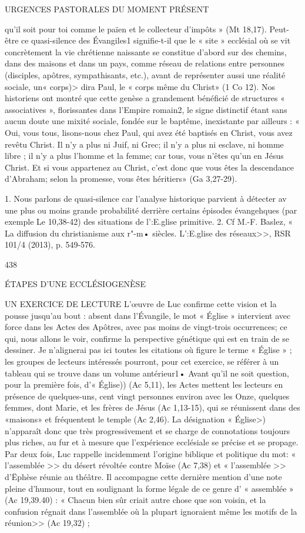 URGENCES PASTORALES DU MOMENT PRÉSENT

qu'il soit pour toi comme le païen et le collecteur d'impôts »
(Mt 18,17).
Peut-être ce quasi-silence des Évangiles1 signifie-t-il que le
« site » ecclésial où se vit concrètement la vie chrétienne naissante se constitue d'abord sur des chemins, dans des maisons et dans un pays, comme réseau de relations entre personnes (disciples, apôtres, sympathisants, etc.), avant de représenter aussi une réalité sociale, un« corps)> dira Paul, le « corps même du Christ» (1 Co 12). Nos historiens ont montré que cette genèse a grandement bénéficié de structures « associatives », florissantes dans l'Empire romain2, le signe distinctif étant sans aucun doute une mixité sociale, fondée sur le baptême, inexistante par ailleurs :
« Oui, vous tous, lisons-nous chez Paul, qui avez été baptisés en Christ, vous avez revêtu Christ. Il n'y a plus ni Juif, ni Grec; il n'y a plus ni esclave, ni homme libre ; il n'y a plus l'homme et la femme; car tous, vous n'êtes qu'un en Jésus Christ. Et si vous appartenez au Christ, c'est donc que vous êtes la descendance d'Abraham; selon la promesse, vous êtes héritiers» (Ga 3,27-29).




1.	Nous parlons de quasi-silence car l'analyse historique parvient à détecter av une plus ou moins grande probabilité derrière certains épisodes évangehques (par exemple Le 10,38-42) des situations de l':E.glise primitive.
2.	Cf M.-F. Baslez, « La diffusion du christianisme aux r"-m• siècles.
L':E.glise des réseaux>>, RSR 101/4 (2013), p. 549-576.

438
 
ÉTAPES D'UNE ECCLÉSIOGENÈSE


UN EXERCICE DE LECTURE
L'œuvre de Luc confirme cette vision et la pousse jusqu'au bout : absent dans l'Évangile, le mot « Église » intervient avec force dans les Actes des Apôtres, avec pas moins de vingt-trois occurrences; ce qui, nous allons le voir, confirme la perspective génétique qui est en train de se dessiner. Je n'alignerai pas ici toutes les citations où figure le terme « Église » ; les groupes de lecteurs intéressés pourront, pour cet exercice, se référer à un tableau qui se trouve dans un volume antérieur1•
Avant qu'il ne soit question, pour la première fois,
d'« Église)) (Ac 5,11), les Actes mettent les lecteurs en présence de quelques-uns, cent vingt personnes environ avec les Onze, quelques femmes, dont Marie, et les frères de Jésus (Ac 1,13-15), qui se réunissent dans des «maisons» et fréquentent le temple (Ac 2,46). La désignation « Église>) n'apparaît donc que très progressivement et se charge de connotations toujours plus riches, au fur et à mesure que l'expérience ecclésiale se précise et se propage. Par deux fois, Luc rappelle incidemment l'origine biblique et politique du mot: « l'assemblée >> du désert révoltée contre Moïse (Ac 7,38) et « l'assemblée >> d'Ëphèse réunie au théâtre. Il accompagne cette dernière mention d'une note pleine d'humour, tout en soulignant la forme légale de ce genre d' « assemblée » (Ac 19,39.40) : « Chacun bien sûr criait autre chose que son voisin, et la confusion régnait dans l'assemblée où la plupart ignoraient même les motifs de la réunion>> (Ac 19,32) ;

